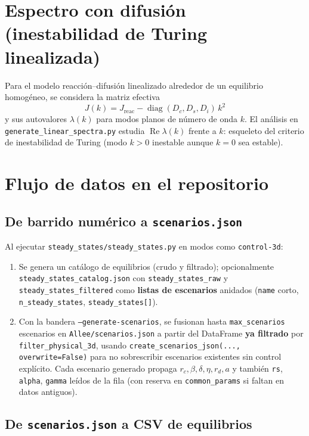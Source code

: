 \documentclass[11pt,a4paper]{article}
\begin{document}
\section{Espectro con difusión (inestabilidad de Turing linealizada)}

Para el modelo reacción--difusión linealizado alrededor de un equilibrio homogéneo, se considera la matriz efectiva
\begin{equation}
\label{eq:Jk}
J(k) = J_{\mathrm{reac}} - \operatorname{diag}(D_c,D_s,D_i)\,k^2
\end{equation}
y sus autovalores $\lambda(k)$ para modos planos de número de onda $k$. El análisis en \texttt{generate\_linear\_spectra.py} estudia $\operatorname{Re}\lambda(k)$ frente a $k$: esqueleto del criterio de inestabilidad de Turing (modo $k>0$ inestable aunque $k=0$ sea estable).

\section{Flujo de datos en el repositorio}

\subsection{De barrido numérico a \texttt{scenarios.json}}

Al ejecutar \texttt{steady\_states/steady\_states.py} en modos como \texttt{control-3d}:
\begin{enumerate}[leftmargin=*]
  \item Se genera un catálogo de equilibrios (crudo y filtrado); opcionalmente \texttt{steady\_states\_catalog.json} con \texttt{steady\_states\_raw} y \texttt{steady\_states\_filtered} como \textbf{listas de escenarios} anidados (\texttt{name} corto, \texttt{n\_steady\_states}, \texttt{steady\_states[]}).
  \item Con la bandera \texttt{--generate-scenarios}, se fusionan hasta \texttt{max\_scenarios} escenarios en \texttt{Allee/scenarios.json} a partir del DataFrame \textbf{ya filtrado} por \texttt{filter\_physical\_3d}, usando \texttt{create\_scenarios\_json(..., overwrite=False)} para no sobrescribir escenarios existentes sin control explícito. Cada escenario generado propaga $r_c,\beta,\delta,\eta,r_d,a$ y también \texttt{rs}, \texttt{alpha}, \texttt{gamma} leídos de la fila (con reserva en \texttt{common\_params} si faltan en datos antiguos).
\end{enumerate}

\subsection{De \texttt{scenarios.json} a CSV de equilibrios}
\end{document}
